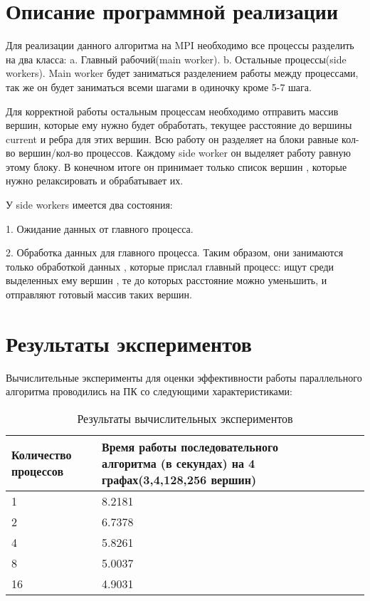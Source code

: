 \documentclass{report}
\begin{document}
\section*{Описание программной реализации}
\par
Для реализации данного алгоритма на MPI необходимо все процессы разделить на два
класса:
a. Главный рабочий(main worker).
b. Остальные процессы(side workers).
Main worker будет заниматься разделением работы между процессами, так же он будет
заниматься всеми шагами в одиночку кроме 5-7 шага.
\par
Для корректной работы остальным процессам необходимо отправить массив вершин,
которые ему нужно будет обработать, текущее расстояние до вершины current и ребра для
этих вершин. Всю работу он разделяет на блоки равные кол-во вершин/кол-во процессов.
Каждому side worker он выделяет работу равную этому блоку.
В конечном итоге он принимает только список вершин , которые нужно релаксировать и
обрабатывает их.
\par
У side workers имеется два состояния:
\par 1. Ожидание данных от главного процесса.
\par 2. Обработка данных для главного процесса.
Таким образом, они занимаются только обработкой данных , которые прислал главный
процесс: ищут среди выделенных ему вершин , те до которых расстояние можно
уменьшить, и отправляют готовый массив таких вершин.
\newpage

\section*{Результаты экспериментов}
Вычислительные эксперименты для оценки эффективности работы параллельного алгоритма проводились на ПК со следующими характеристиками:
\begin{table}[!h]
\caption{Результаты вычислительных экспериментов}
\centering
\begin{tabular}{| p{2cm} | p{3cm} | p{4cm} | p{2cm} |}
\hline
Количество процессов & Время работы последовательного алгоритма (в секундах) на 4 графах(3,4,128,256 вершин)\\[5pt]
\hline
1        & 8.2181          \\
2        & 6.7378        \\
4        & 5.8261         \\
8        & 5.0037        \\
16        & 4.9031        \\
\hline
\end{tabular}
\end{table}
\end{document}
